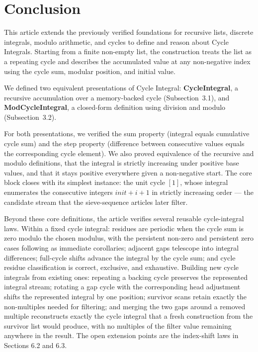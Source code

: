 \section{Conclusion}

This article extends the previously verified foundations for recursive
lists, discrete integrals, modulo arithmetic, and cycles to define and
reason about Cycle Integrals. Starting from a finite non-empty list, the
construction treats the list as a repeating cycle and describes the
accumulated value at any non-negative index using the cycle sum, modular
position, and initial value.

We defined two equivalent presentations of Cycle Integral:
\textbf{CycleIntegral}, a recursive accumulation over a memory-backed cycle
(Subsection~3.1), and \textbf{ModCycleIntegral}, a closed-form definition
using division and modulo (Subsection~3.2).

For both presentations, we verified the sum property (integral equals
cumulative cycle sum) and the step property (difference between consecutive
values equals the corresponding cycle element). We also proved equivalence
of the recursive and modulo definitions, that the integral is strictly
increasing under positive base values, and that it stays positive
everywhere given a non-negative start. The core block closes with its
simplest instance: the unit cycle $[1]$, whose integral enumerates the
consecutive integers $init + i + 1$ in strictly increasing order --- the
candidate stream that the sieve-sequence articles later filter.

Beyond these core definitions, the article verifies several reusable
cycle-integral laws. Within a fixed cycle integral: residues are periodic
when the cycle sum is zero modulo the chosen modulus, with the persistent
non-zero and persistent zero cases following as immediate corollaries;
adjacent gaps telescope into integral differences; full-cycle shifts advance
the integral by the cycle sum; and cycle residue classification is correct,
exclusive, and exhaustive. Building new cycle integrals from existing ones:
repeating a backing cycle preserves the represented integral stream;
rotating a gap cycle with the corresponding head adjustment shifts the
represented integral by one position; survivor scans retain exactly the
non-multiples needed for filtering; and merging the two gaps around a
removed multiple reconstructs exactly the cycle integral that a fresh
construction from the survivor list would produce, with no multiples of
the filter value remaining anywhere in the result. The open extension
points are the index-shift laws in Sections 6.2 and 6.3.

